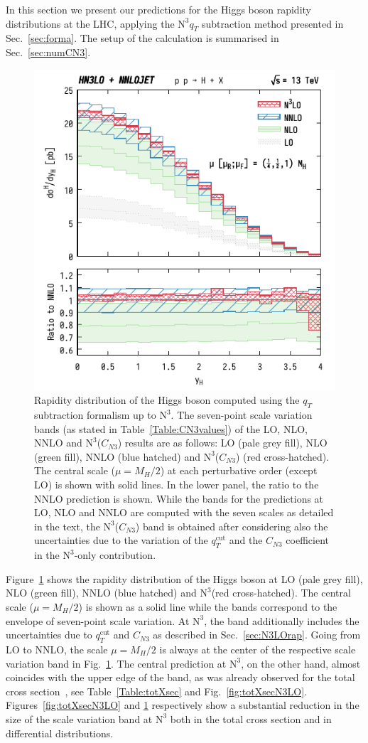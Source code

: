 \documentclass[12pt]{article}
\DeclareRobustCommand{\qt}{\ensuremath{q_T}\xspace}
\DeclareRobustCommand{\qtcut}{\ensuremath{q_T^\mathrm{cut}}\xspace}
\DeclareRobustCommand{\LO}{\text{LO}\xspace}
\DeclareRobustCommand{\N}[1]{\ensuremath{\text{N}^{#1}}} %
\begin{document}
In this section we present our predictions for the Higgs boson rapidity distributions at the LHC, applying the \N3\LO $\qt$ subtraction method presented in Sec.~\ref{sec:forma}. The setup of the calculation is summarised in Sec.~\ref{sec:numCN3}. 

\begin{figure}[tbh]
\centering
\includegraphics[width=.6\linewidth]{./JHEP_figures/yH_B02_best}
\caption{\label{fig:yHN3LO}{Rapidity distribution of the Higgs boson computed using the $\qt$ subtraction formalism up to \N3\LO. The seven-point scale variation bands (as stated in Table~\ref{Table:CN3values}) of the LO, NLO, NNLO and \N3\LO($C_{N3}$) results are as follows: LO (pale grey fill), NLO (green fill), NNLO (blue hatched) and \N3\LO($C_{N3}$) (red cross-hatched). The central scale ($\mu=M_{H}/2$) at each perturbative order (except LO) is shown with solid lines. In the lower panel, the ratio to the NNLO prediction is shown. While the bands for the predictions at LO, NLO and NNLO are computed with the seven scales as detailed in the text, the \N3\LO($C_{N3}$) band is obtained after considering also the uncertainties due to the variation of the $\qtcut$ and the $C_{N3}$ coefficient in the 
\N3\LO-only contribution.
}}
\end{figure}

Figure~\ref{fig:yHN3LO} shows the rapidity distribution of the Higgs boson at LO (pale grey fill), NLO (green fill), NNLO (blue hatched) and \N3\LO (red cross-hatched). 
The central scale ($\mu=M_{H}/2$) is shown as a solid line while the bands correspond to the envelope of seven-point scale variation. 
At \N3\LO, the band additionally includes the uncertainties due to $\qtcut$ and $C_{N3}$ as described in Sec.~\ref{sec:N3LOrap}.
Going from LO to NNLO, the scale $\mu=M_{H}/2$ is always at the center of the respective scale variation band in Fig.~\ref{fig:yHN3LO}.  The central prediction at \N3\LO, on the other hand, almost coincides with the upper edge of the band, as was already observed for the total cross section~\cite{Anastasiou:2015ema,Mistlberger:2018etf}, see Table~\ref{Table:totXsec} and Fig.~\ref{fig:totXsecN3LO}.
Figures~\ref{fig:totXsecN3LO} and \ref{fig:yHN3LO} respectively show a substantial reduction in the size of the scale variation band at \N3\LO both in the total cross section and in differential distributions.
\end{document}

